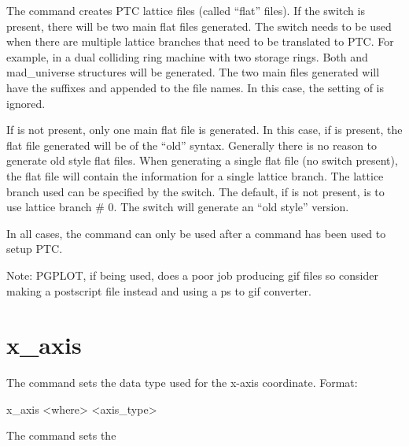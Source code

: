 {{{{{{The  command creates PTC lattice files (called ``flat'' files).  If the
 switch is present, there will be two main flat files generated. The 
switch needs to be used when there are multiple lattice branches that need to be
translated to PTC. For example, in a dual colliding ring machine with two storage rings.
Both  and  mad_universe structures will be generated. The two main files
generated will have the suffixes  and  appended to the file names. In
this case, the setting of  is ignored.

If  is not present, only one main flat file is generated. In this case, if
 is present, the flat file generated will be of the ``old'' syntax. Generally
there is no reason to generate old style flat files. When generating a single flat file
(no  switch present), the flat file will contain the information for a single
lattice branch. The lattice branch used can be specified by the  switch. The
default, if  is not present, is to use lattice branch \# 0. The 
switch will generate an ``old style'' version.

In all cases, the  command can only be used after a  command
has been used to setup PTC.

Note: PGPLOT, if being used, does a poor job producing gif files so consider making a
postscript file instead and using a ps to gif converter.

\section{x_axis}
\label{s:x.axis}

The  command sets the data type used for the x-axis coordinate. Format:
\begin{example}
  x_axis <where> <axis_type>
\end{example}

\vskip 7pt 

The  command sets the \vn{plot%
for the horizontal axis. Possibilities for \vn{<axis_type>} are:
\begin{example}
  index     -- Use data index
  ele_index -- Use data element index
  s         -- Use longitudinal position.
\end{example}
Note that \vn{index} only makes sense for data that has an index associated with it.

}}}}}}}
